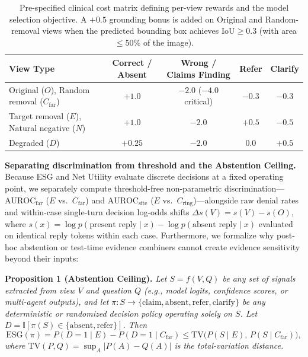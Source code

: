 \documentclass{article} %
\begin{document}
\begin{table}[t]
\caption{Pre-specified clinical cost matrix defining per-view rewards and the model selection objective. A $+0.5$ grounding bonus is added on Original and Random-removal views when the predicted bounding box achieves $\text{IoU} \ge 0.3$ (with area $\le 50\%$ of the image).}
\label{tab:cost_matrix}
\vspace{-0.2cm}
\begin{center}
\small
\begin{tabular}{lcccc}
\toprule
\textbf{View Type} & \textbf{Correct / Absent} & \textbf{Wrong / Claims Finding} & \textbf{Refer} & \textbf{Clarify} \\
\midrule
Original ($O$), Random removal ($C_{\text{far}}$) & $+1.0$ & $-2.0$ ($-4.0$ critical) & $-0.3$ & $-0.3$ \\
Target removal ($E$), Natural negative ($N$) & $+1.0$ & $-2.0$ & $+0.5$ & $-0.5$ \\
Degraded ($D$) & $+0.25$ & $-2.0$ & $0.0$ & $+0.5$ \\
\bottomrule
\end{tabular}
\end{center}
\vspace{-0.2cm}
\end{table}

\textbf{Separating discrimination from threshold and the Abstention Ceiling.} Because ESG and Net Utility evaluate discrete decisions at a fixed operating point, we separately compute threshold-free non-parametric discrimination---$\text{AUROC}_{\text{far}}$ ($E$ vs.\ $C_{\text{far}}$) and $\text{AUROC}_{\text{site}}$ ($E$ vs.\ $C_{\text{ring}}$)---alongside raw denial rates and within-case single-turn decision log-odds shifts $\Delta s(V) = s(V) - s(O)$, where $s(x) = \log p(\text{present reply} \mid x) - \log p(\text{absent reply} \mid x)$ evaluated on identical reply tokens within each case. Furthermore, we formalize why post-hoc abstention or test-time evidence combiners cannot create evidence sensitivity beyond their inputs:

\textbf{Proposition 1 (Abstention Ceiling).} \emph{Let $S = f(V, Q)$ be any set of signals extracted from view $V$ and question $Q$ (e.g., model logits, confidence scores, or multi-agent outputs), and let $\pi: S \to \{\text{claim}, \text{absent}, \text{refer}, \text{clarify}\}$ be any deterministic or randomized decision policy operating solely on $S$. Let $D = \mathbb{I}[\pi(S) \in \{\text{absent}, \text{refer}\}]$. Then}
\begin{equation}
\label{eq:abstention_ceiling}
\text{ESG}(\pi) = P(D = 1 \mid E) - P(D = 1 \mid C_{\text{far}}) \le \text{TV}\big(P(S \mid E),\, P(S \mid C_{\text{far}})\big),
\end{equation}
\emph{where $\text{TV}(P, Q) = \sup_{A} |P(A) - Q(A)|$ is the total-variation distance.}
\end{document}
